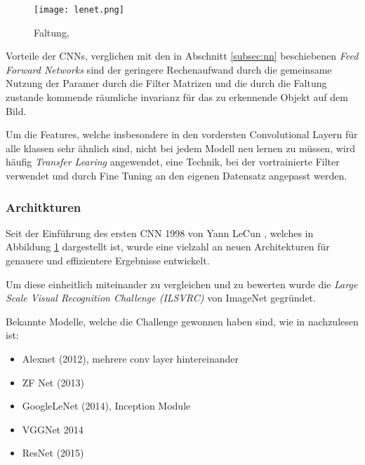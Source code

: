 \begin{figure}[H]
    \centering
    \label{fig:lenet}
    \texttt{[image: lenet.png]}
    \caption{Faltung, \cite{lecunGradientBasedLearningApplied1998}}
\end{figure}


Vorteile der CNNs, verglichen mit den in Abschnitt \ref{subsec:nn} beschiebenen 
\textit{Feed Forward Networks} sind der geringere Rechenaufwand
durch die gemeinsame Nutzung der Paramer durch die Filter Matrizen und die durch die 
Faltung zustande kommende räumliche invarianz für das zu erkennende 
Objekt auf dem Bild.

Um die Features, welche insbesondere in den vordersten Convolutional 
Layern für alle klassen sehr ähnlich sind, nicht bei jedem Modell
neu lernen zu müssen, wird häufig \textit{Transfer Learing} angewendet, 
eine Technik, bei der vortrainierte Filter verwendet und durch Fine 
Tuning an den eigenen Datensatz angepasst werden.


\subsubsection{Architkturen}\label{subsubsec:architecture}

Seit der Einführung des ersten CNN 1998 von Yann LeCun
\cite{lecunGradientBasedLearningApplied1998}, welches in 
Abbildung \ref{fig:lenet} dargestellt ist, wurde eine 
vielzahl an neuen Architekturen für genauere und effizientere
Ergebnisse entwickelt.

Um diese einheitlich miteinander zu vergleichen und zu 
bewerten wurde die \textit{Large Scale Visual Recognition Challenge (ILSVRC)}
\cite{ImageNetLargeScale} von ImageNet gegründet.

Bekannte Modelle, welche die Challenge gewonnen haben 
sind, wie in \cite{StanfordCS231nConvolutional} nachzulesen ist:



\begin{itemize}
    \item Alexnet (2012), mehrere conv layer hintereinander
    \item ZF Net (2013)
    \item GoogleLeNet (2014), Inception Module
    \item VGGNet 2014
    \item ResNet (2015)
\end{itemize}



